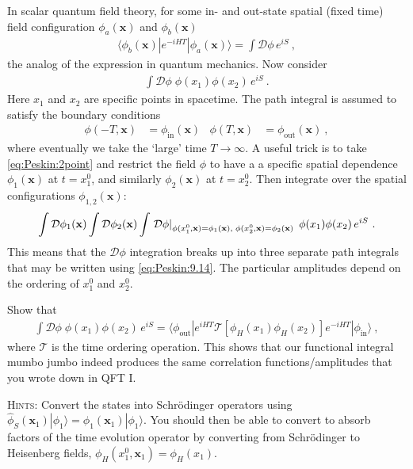 \documentclass[12pt]{article}
\numberwithin{equation}{subsection}    %
\renewcommand{\vec}[1]{\mathbf{#1}} %
\begin{document}
In scalar quantum field theory, for some in- and out-state spatial (fixed time) field configuration $\phi_a(\vec{x})$ and $\phi_b(\vec{x})$
\begin{align}
	\langle \phi_b(\vec{x}) | e^{-iHT} | \phi_a(\vec{x}) \rangle 
	= 
	\int \mathcal D \phi \, e^{iS}  \ ,
	\label{eq:Peskin:9.14}
\end{align}
the analog of the expression in quantum mechanics.
%
Now consider
\begin{align}
	\int \mathcal D\phi \; \phi(x_1) \phi(x_2)\, e^{iS} \ . 
	\label{eq:Peskin:2point}
\end{align}
Here $x_1$ and $x_2$ are specific points in spacetime.
The path integral is assumed to satisfy the boundary conditions
\begin{align}
	\phi(-T, \vec{x}) &= \phi_{\text{in}}(\vec{x})
	&
	\phi(T, \vec{x}) &= \phi_{\text{out}}(\vec{x}) \ ,
\end{align}
where eventually we take the `large' time $T\to \infty$.
A useful trick is to take \eqref{eq:Peskin:2point} and restrict the field $\phi$ to have a a specific spatial dependence $\phi_1(\vec{x})$ at $t=x_1^0$, and similarly $\phi_2(\vec{x})$ at $t=x_2^0$. Then integrate over the spatial configurations $\phi_{1,2}(\vec{x})$:
\begin{align}
	\int \mathcal D\phi_1(\vec{x})
	\int \mathcal D\phi_2(\vec{x})
	\int \left. \mathcal D\phi\right|_{%
	\phi(x^0_1,\vec{x})=\phi_1(\vec{x}) ,\; 
	\phi(x^0_2,\vec{x})=\phi_2(\vec{x})
	} \; \phi(x_1) \phi(x_2)\, e^{iS} \ . 
	\label{eq:Peskin:2point:b}
\end{align}
This means that the $\mathcal D \phi$ integration breaks up into three separate path integrals that may be written using \eqref{eq:Peskin:9.14}. The particular amplitudes depend on the ordering of $x_1^0$ and $x_2^0$. 

Show that 
\begin{align}
	\int \mathcal D\phi \; \phi(x_1) \phi(x_2)\, e^{iS} 
	= 
	\langle \phi_\text{out} |
	e^{iHT}
	\mathcal T\left[ \phi_H(x_1) \phi_H(x_2) \right]
	e^{-iHT}
	| \phi_\text{in} \rangle \ ,
\end{align}
where $\mathcal T$ is the time ordering operation. This shows that our functional integral mumbo jumbo indeed produces the same correlation functions/amplitudes that you wrote down in QFT I.

\textsc{Hints}: Convert the states into Schr\"odinger operators using $\hat \phi_S(\vec{x}_1)|\phi_1\rangle = \phi_1(\vec{x}_1)|\phi_1 \rangle$. You should then be able to convert to absorb factors of the time evolution operator by converting from Schr\"odinger to Heisenberg fields, $\phi_H(x^0_1, \vec{x}_1) = \phi_H(x_1)$. 
\end{document}
